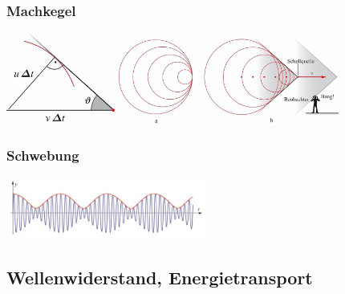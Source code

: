 \subsubsection{Machkegel}
\begin{center}
	\begin{minipage}{0.1\textwidth}
	\end{minipage}%
	\begin{minipage}{0.4\textwidth}
		\includegraphics[height=3cm,keepaspectratio=true]{Images/machkegel.png}
		\includegraphics[height=3cm,keepaspectratio=true]{Images/machkegel_vorher_nachher.png}
	\end{minipage}
\end{center}


\subsubsection{Schwebung}
\begin{center}
	\begin{minipage}{0.2\textwidth}
	\end{minipage}%
	\begin{minipage}{0.3\textwidth}
		\includegraphics[height=2cm,keepaspectratio=true]{Images/schwebung.png}
	\end{minipage}
\end{center}




\subsection{Wellenwiderstand, Energietransport}
